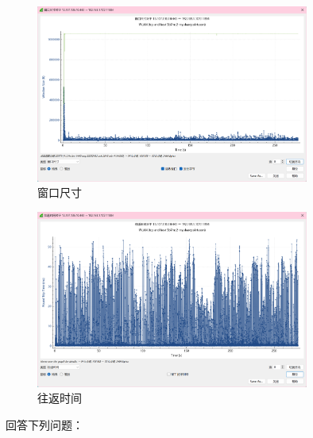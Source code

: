 \documentclass{article}
\begin{document}
\begin{figure}[H]
  \centering
  \includegraphics[width=0.8\textwidth]{img/13.png}
  \caption{窗口尺寸}
\end{figure}

\begin{figure}[H]
  \centering
  \includegraphics[width=0.8\textwidth]{img/14.png}
  \caption{往返时间}
\end{figure}

回答下列问题：
\end{document}
